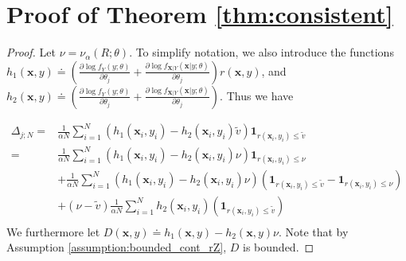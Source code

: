 \documentclass[letterpaper]{article}
\newcommand{\var}{\nu_\alpha}
\newcommand{\bx}{\mathbf{x}}
\newcommand{\bX}{\mathbf{X}}
\newcommand{\Dt}[1]{\frac{\partial {#1}}{\partial \theta_j}}
\newcommand{\dcvar}{\Delta_{j;N}} %
\newcommand{\evar}{\tilde{v}}  %
\begin{document}
\section{Proof of Theorem \ref{thm:consistent}}\label{sec:proof:consistent}
\begin{proof}
Let $\nu = \var(R;\theta)$. To simplify notation, we also introduce the functions
$h_1(\bx,y) \doteq \left(\Dt{ \log f_{Y}\left(y;\theta\right)} + \Dt{ \log f_{\bX|Y}\left(\bx|y;\theta\right)}\right)r(\bx,y)$, and
$h_2(\bx,y) \doteq \left(\Dt{ \log f_{Y}\left(y;\theta\right)} + \Dt{ \log f_{\bX|Y}\left(\bx|y;\theta\right)}\right)$. Thus we have

\begin{equation}\label{eq:proof_consistent_1}
\begin{split}
\dcvar =& \frac{1}{\alpha N}\sum_{i=1}^{N} \left(h_1(\bx_i,y_i) - h_2(\bx_i,y_i)\evar\right)\mathbf{1}_{r(\bx_{i},y_i)\leq \evar} \\
=& \frac{1}{\alpha N}\sum_{i=1}^{N} \left(h_1(\bx_i,y_i) - h_2(\bx_i,y_i)\nu\right)\mathbf{1}_{r(\bx_{i},y_i)\leq \nu} \\
&+ \frac{1}{\alpha N}\sum_{i=1}^{N} \left(h_1(\bx_i,y_i) - h_2(\bx_i,y_i)\nu\right)\left(\mathbf{1}_{r(\bx_{i},y_i)\leq \evar} - \mathbf{1}_{r(\bx_{i},y_i)\leq \nu}\right)\\
&+ \left( \nu - \evar \right) \frac{1}{\alpha N} \sum_{i=1}^{N} h_2(\bx_i,y_i)\left(\mathbf{1}_{r(\bx_{i},y_i)\leq \evar} \right)\\
\end{split}
\end{equation}
We furthermore let $D(\bx,y) \doteq h_1(\bx,y) - h_2(\bx,y)\nu$.
Note that by Assumption \ref{assumption:bounded_cont_rZ}, $D$ is bounded.


\end{proof}
\end{document}
